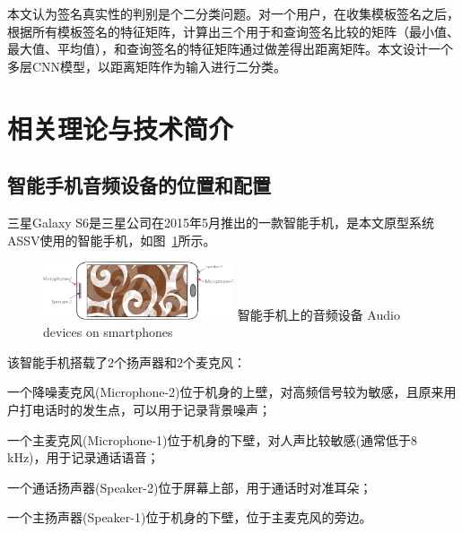 本文认为签名真实性的判别是个二分类问题。对一个用户，在收集模板签名之后，根据所有模板签名的特征矩阵，计算出三个用于和查询签名比较的矩阵（最小值、最大值、平均值），和查询签名的特征矩阵通过做差得出距离矩阵。本文设计一个多层CNN模型，以距离矩阵作为输入进行二分类。

\section{相关理论与技术简介}

\subsection{智能手机音频设备的位置和配置}

三星Galaxy S6是三星公司在2015年5月推出的一款智能手机，是本文原型系统ASSV使用的智能手机，如图~\ref{fig:audio-device-smartphone}所示。
\begin{figure}[!htp]
  \centering
  \includegraphics[width=0.5\textwidth]{figure/smartphone.pdf}
  \bicaption
    {智能手机上的音频设备}
    {Audio devices on smartphones}
  \label{fig:audio-device-smartphone}
\end{figure}
该智能手机搭载了2个扬声器和2个麦克风：
\begin{enumerate*}[label=\alph*)]
    \item 一个降噪麦克风(Microphone-2)位于机身的上壁，对高频信号较为敏感，且原来用户打电话时的发生点，可以用于记录背景噪声；
    \item 一个主麦克风(Microphone-1)位于机身的下壁，对人声比较敏感(通常低于8 kHz)，用于记录通话语音；
    \item 一个通话扬声器(Speaker-2)位于屏幕上部，用于通话时对准耳朵；
    \item 一个主扬声器(Speaker-1)位于机身的下壁，位于主麦克风的旁边。
\end{enumerate*}

